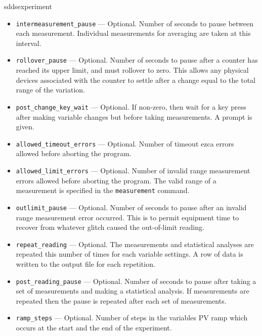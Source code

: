 \begin{sddsprog}{sddsexperiment}
\begin{itemize}
\begin{itemize}
        \item {\verb+intermeasurement_pause+} ---  Optional. Number of seconds to pause between each measurement.
                Individual measurements for averaging are taken at this interval.
        \item {\verb+rollover_pause+} ---  Optional. Number of seconds to pause after a counter has reached
                its upper limit, and must rollover to zero. This allows any physical devices
                associated with the counter to settle after a change equal to the total range
                of the variation.
        \item {\verb+post_change_key_wait+} ---  Optional. If non-zero, then wait for a key press after
                making variable changes but before taking measurements. A prompt is given.
        \item {\verb+allowed_timeout_errors+} ---  Optional. Number of timeout ezca errors allowed before aborting the
                program. 
        \item {\verb+allowed_limit_errors+} ---  Optional. Number of invalid range measurement errors 
                allowed before aborting the
                program. The valid range of a measurement is specified in the {\verb+measurement+} command.
        \item {\verb+outlimit_pause+} ---  Optional. Number of seconds to pause after an invalid range measurement error
                occurred. This is to permit equipment time to recover from whatever glitch caused the out-of-limit
                reading.
        \item {\verb+repeat_reading+} --- Optional. The measurements and statistical analyses are repeated this number of 
                times for each variable settings. A row of data is written to the output file
                for each repetition.
        \item {\verb+post_reading_pause+} --- Optional. Number of seconds to pause after taking a 
                set of measurements and making a statistical analysis.
                If measurements are repeated then the pause is repeated after each set of measurements.
        \item {\verb+ramp_steps+} --- Optional. Number of steps in the variables PV ramp 
                which occurs at the start and the end of the experiment.


\end{itemize}
\end{itemize}
\end{sddsprog}
